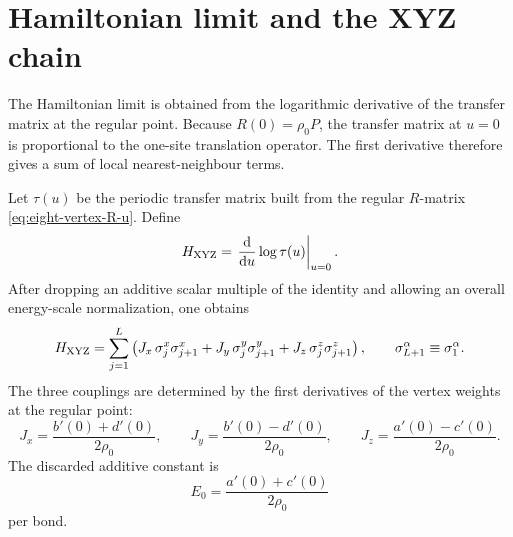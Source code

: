 \section{Hamiltonian limit and the XYZ chain}
\label{sec:eight-vertex-xyz-hamiltonian-limit}

The Hamiltonian limit is obtained from the logarithmic derivative of the transfer
matrix at the regular point.  Because $R(0)=\rho_0P$, the transfer matrix at
$u=0$ is proportional to the one-site translation operator.  The first derivative
therefore gives a sum of local nearest-neighbour terms.

\begin{proposition}
Let $\tau(u)$ be the periodic transfer matrix built from the regular
$R$-matrix \cref{eq:eight-vertex-R-u}.  Define
\begin{equation}
\label{eq:eight-vertex-H-log-derivative}
    H_{\rm XYZ}
    =\left.\frac{\mathrm{d}}{\mathrm{d} u}\log\tau(u)\right|_{u=0}.
\end{equation}
After dropping an additive scalar multiple of the identity and allowing an
overall energy-scale normalization, one obtains
\begin{equation}
\label{eq:XYZ-Hamiltonian-main}
    H_{\rm XYZ}
    =
    \sum_{j=1}^{L}
    \left(
        J_x\,\sigma_j^x\sigma_{j+1}^x
        +J_y\,\sigma_j^y\sigma_{j+1}^y
        +J_z\,\sigma_j^z\sigma_{j+1}^z
    \right),
    \qquad
    \sigma_{L+1}^{\alpha}\equiv\sigma_1^{\alpha}.
\end{equation}
The three couplings are determined by the first derivatives of the vertex
weights at the regular point:
\begin{equation}
\label{eq:eight-vertex-Jxyz-from-weight-derivatives}
    J_x=\frac{b'(0)+d'(0)}{2\rho_0},
    \qquad
    J_y=\frac{b'(0)-d'(0)}{2\rho_0},
    \qquad
    J_z=\frac{a'(0)-c'(0)}{2\rho_0}.
\end{equation}
The discarded additive constant is
\begin{equation}
\label{eq:eight-vertex-additive-constant}
    E_0=\frac{a'(0)+c'(0)}{2\rho_0}
\end{equation}
per bond.
\end{proposition}

